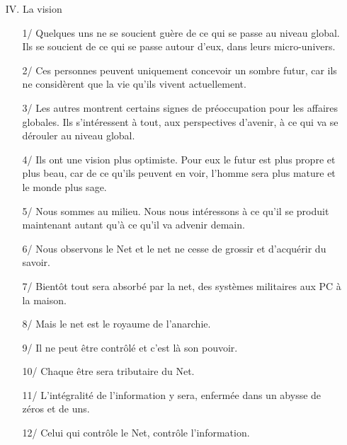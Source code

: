 \documentclass[11pt,twoside,a4paper]{book}
\begin{document}
\begin{enumerate}
\begin{enumerate}
		\item[12/] Nous avons besoin de nouvelles lois. Des lois en ad{\'e}quations avec l'{\'e}poque et le monde dans lesquels nous vivons et non pas des lois {\'e}difi{\'e}es sur les bases du pass{\'e}. Des lois cr{\'e}{\'e}es pour aujourd'hui et qui seront toujours valables demain.
		\item[13/] Ce sont uniquement ces lois qui nous retiennent, des lois qui ont grandement besoin de corrections.
	\end{enumerate}
	\item[IV.] La vision
	\begin{enumerate}
		\setlength{\itemsep}{1pt}
		\setlength{\parskip}{0pt}
		\setlength{\parsep}{0pt}
		
		\item[1/] Quelques uns ne se soucient gu{\`e}re de ce qui se passe au niveau global. Ils se soucient de ce qui se passe autour d'eux, dans leurs micro-univers.
		\item[2/] Ces personnes peuvent uniquement concevoir un sombre futur, car ils ne consid{\`e}rent que la vie qu'ils vivent actuellement.
		\item[3/] Les autres montrent certains signes de pr{\'e}occupation pour les affaires globales. Ils s'int{\'e}ressent {\`a} tout, aux perspectives d'avenir, {\`a} ce qui va se d{\'e}rouler au niveau global.
		\item[4/] Ils ont une vision plus optimiste. Pour eux le futur est plus propre et plus beau, car de ce qu'ils peuvent en voir, l'homme sera plus mature et le monde plus sage.
		\item[5/] Nous sommes au milieu. Nous nous int{\'e}ressons {\`a} ce qu'il se produit maintenant autant qu'{\`a} ce qu'il va advenir demain.
		\item[6/] Nous observons le Net et le net ne cesse de grossir et d'acqu{\'e}rir du savoir.
		\item[7/] Bient{\^o}t tout sera absorb{\'e} par la net, des syst{\`e}mes militaires aux PC {\`a} la maison.
		\item[8/] Mais le net est le royaume de l'anarchie.
		\item[9/] Il ne peut {\^e}tre contr{\^o}l{\'e} et c'est l{\`a} son pouvoir.
		\item[10/] Chaque {\^e}tre sera tributaire du Net.
		\item[11/] L'int{\'e}gralit{\'e} de l'information y sera, enferm{\'e}e dans un abysse de z{\'e}ros et de uns.
		\item[12/] Celui qui contr{\^o}le le Net, contr{\^o}le l'information.

\end{enumerate}
\end{enumerate}
\end{document}
